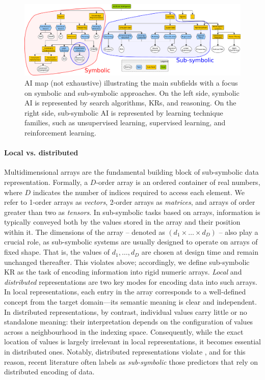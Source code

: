 \begin{figure}
    \centering
    \includegraphics[width=\textwidth]{figures/ai-map2}
    \caption[Overview of the field of artificial intelligence]{
        \Gls{AI} map (not exhaustive) illustrating the main subfields with a focus on symbolic and sub-symbolic approaches.
        On the left side, symbolic \gls{AI} is represented by search algorithms, \glspl{KR}, and reasoning.
        On the right side, sub-symbolic \gls{AI} is represented by learning technique families, such as unsupervised learning, supervised learning, and reinforcement learning.
    }
    \label{fig:ai-map}
\end{figure}




\paragraph{Local vs. distributed}
%
Multidimensional arrays are the fundamental building block of sub-symbolic data representation.
%
Formally, a $D$-order array is an ordered container of real numbers, where $D$ indicates the number of indices required to access each element.
%
We refer to 1-order arrays as \emph{vectors}, 2-order arrays as \emph{matrices}, and arrays of order greater than two as \emph{tensors}.
%
In sub-symbolic tasks based on arrays, information is typically conveyed both by the values stored in the array and their position within it.
%
The dimensions of the array -- denoted as $(d_1 \times \dots \times d_D)$ -- also play a crucial role, as sub-symbolic systems are usually designed to operate on arrays of fixed shape.
%
That is, the values of $d_1, \dots, d_D$ are chosen at design time and remain unchanged thereafter.
%
This violates  above; accordingly, we define sub-symbolic \gls{KR} as the task of encoding information into rigid numeric arrays.
%
\emph{Local} and \emph{distributed} representations are two key modes for encoding data into such arrays.
%
In local representations, each entry in the array corresponds to a well-defined concept from the target domain---its semantic meaning is clear and independent.
%
In distributed representations, by contrast, individual values carry little or no standalone meaning: their interpretation depends on the configuration of values across a neighbourhood in the indexing space.
%
Consequently, while the exact location of values is largely irrelevant in local representations, it becomes essential in distributed ones.
%
Notably, distributed representations violate , and for this reason, recent literature often labels as \emph{sub-symbolic} those predictors that rely on distributed encoding of data.


